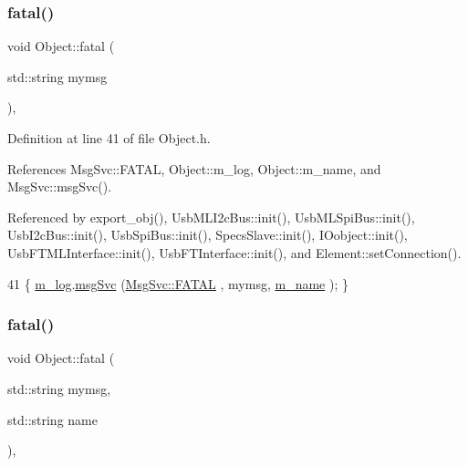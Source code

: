 \subsubsection{\texorpdfstring{fatal()}{fatal()}\hspace{0.1cm}{\footnotesize\ttfamily [1/2]}}
{\footnotesize\ttfamily void Object\+::fatal (\begin{DoxyParamCaption}\item[{std\+::string}]{mymsg }\end{DoxyParamCaption})\hspace{0.3cm}{\ttfamily [inline]}, {\ttfamily [inherited]}}



Definition at line 41 of file Object.\+h.



References Msg\+Svc\+::\+F\+A\+T\+AL, Object\+::m\+\_\+log, Object\+::m\+\_\+name, and Msg\+Svc\+::msg\+Svc().



Referenced by export\+\_\+obj(), Usb\+M\+L\+I2c\+Bus\+::init(), Usb\+M\+L\+Spi\+Bus\+::init(), Usb\+I2c\+Bus\+::init(), Usb\+Spi\+Bus\+::init(), Specs\+Slave\+::init(), I\+Oobject\+::init(), Usb\+F\+T\+M\+L\+Interface\+::init(), Usb\+F\+T\+Interface\+::init(), and Element\+::set\+Connection().


\begin{DoxyCode}
41 \{ \hyperlink{classObject_a0d269813dd7ac1f24bc143031e2963f2}{m\_log}.\hyperlink{classMsgSvc_ad25f18047920cc59a314e5098259711c}{msgSvc} (\hyperlink{classMsgSvc_ae671eb7301996cd049d2da8a65925926a59c73cb29edfc9cdf35845e2b1301363}{MsgSvc::FATAL}   , mymsg, \hyperlink{classObject_a8b83c95c705d2c3ba0d081fe1710f48d}{m\_name} ); \}
\end{DoxyCode}
\mbox{\label{classObject_ae62acd3d09f716220f75f252dc38bc9a}} 
\subsubsection{\texorpdfstring{fatal()}{fatal()}\hspace{0.1cm}{\footnotesize\ttfamily [2/2]}}
{\footnotesize\ttfamily void Object\+::fatal (\begin{DoxyParamCaption}\item[{std\+::string}]{mymsg,  }\item[{std\+::string}]{name }\end{DoxyParamCaption})\hspace{0.3cm}{\ttfamily [inline]}, {\ttfamily [inherited]}}



